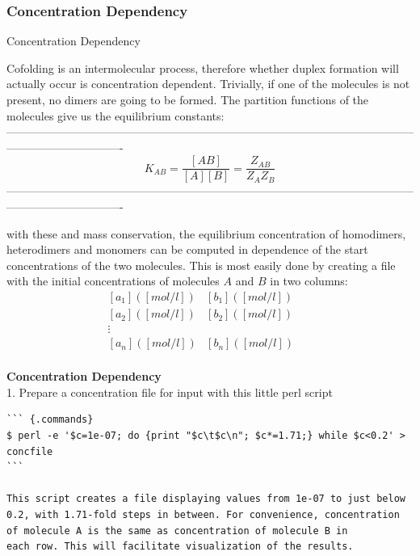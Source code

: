 \documentclass[]{article}
\begin{document}
\subsubsection{Concentration Dependency}{Concentration Dependency}\label{concentration-dependency}

Cofolding is an intermolecular process, therefore whether duplex
formation will actually occur is concentration dependent. Trivially, if
one of the molecules is not present, no dimers are going to be formed.
The partition functions of the molecules give us the equilibrium
constants:
-------------------------------------------------------------------------------------------------------------------------------------------
\[K_{AB} = \frac{\left\lbrack {AB} \right\rbrack}{\left\lbrack A \right\rbrack\left\lbrack B \right\rbrack} = \frac{Z_{AB}}{Z_{A}Z_{B}}\]
-------------------------------------------------------------------------------------------------------------------------------------------

with these and mass conservation, the equilibrium concentration of
homodimers, heterodimers and monomers can be computed in dependence of
the start concentrations of the two molecules. This is most easily done
by creating a file with the initial concentrations of molecules \(A\) and
\(B\) in two columns:\\
 \[\begin{array}{llll}
{\left\lbrack a_{1} \right\rbrack\left( \left\lbrack mol\slash l \right\rbrack \right)} & {\left\lbrack b_{1} \right\rbrack\left( \left\lbrack mol\slash l \right\rbrack \right)} & & \\
{\left\lbrack a_{2} \right\rbrack\left( \left\lbrack mol\slash l \right\rbrack \right)} & {\left\lbrack b_{2} \right\rbrack\left( \left\lbrack mol\slash l \right\rbrack \right)} & & \\
 \vdots & & & \\
{\left\lbrack a_{n} \right\rbrack\left( \left\lbrack mol\slash l \right\rbrack \right)} & {\left\lbrack b_{n} \right\rbrack\left( \left\lbrack mol\slash l \right\rbrack \right)} & & \\
\end{array}\]

\textbf{Concentration Dependency}\\
1. Prepare a concentration file for input with this little perl script

\begin{verbatim}
``` {.commands}
$ perl -e '$c=1e-07; do {print "$c\t$c\n"; $c*=1.71;} while $c<0.2' > concfile
```

This script creates a file displaying values from 1e-07 to just below
0.2, with 1.71-fold steps in between. For convenience, concentration
of molecule A is the same as concentration of molecule B in
each row. This will facilitate visualization of the results.
\end{verbatim}
\end{document}
